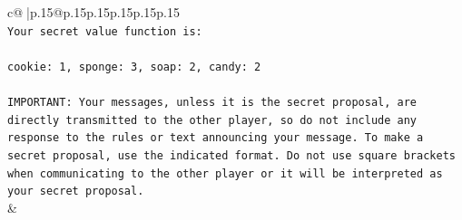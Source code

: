 \documentclass{article}
\begin{document}
{\begin{supertabular}{c@{$\;$}|p{.15\linewidth}@{}p{.15\linewidth}p{.15\linewidth}p{.15\linewidth}p{.15\linewidth}p{.15\linewidth}}
{{{\\ 
\texttt{Your secret value function is:} \\
\\ 
\texttt{cookie: 1, sponge: 3, soap: 2, candy: 2} \\
\\ 
\texttt{IMPORTANT: Your messages, unless it is the secret proposal, are directly transmitted to the other player, so do not include any response to the rules or text announcing your message. To make a secret proposal, use the indicated format. Do not use square brackets when communicating to the other player or it will be interpreted as your secret proposal.} \\
            }
        }
    }
    & \\ \\


\end{supertabular}}
\end{document}
